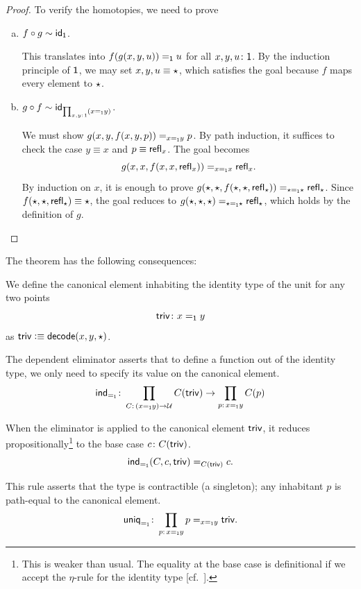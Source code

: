 \begin{proof}
    To verify the homotopies, we need to prove
    \begin{enumerate}[a),font=\upshape]
        \item $f\circ g \sim \mathsf{id}_{\mathsf{1}}$.

        This translates into $f(g(x,y,u)) \mathrel{=_{\mathsf{1}}} u$ for all $x,y,u\colon\fun1$.
        By the induction principle of $\mathsf{1}$, we may set $x,y,u\equiv{\mathsf{\star}}$, which satisfies the goal because $f$ maps every element to ${\mathsf{\star}}$.

        \item $g\circ f \sim \id_{\prod_{x,y\colon\fun1}(x\eq{\fun1}y)}$.

        We must show $g(x,y,f(x,y,p))\mathrel{=_{x\mathrel{=_{\mathsf{1}}}y}}p$.
        By path induction, it suffices to check the case $y\equiv x$ and $p\equiv\mathsf{refl}_x$. The goal becomes
        \[
            g(x,x,f(x,x,\mathsf{refl}_x))\mathrel{=_{x\mathrel{=_{\mathsf{1}}}x}}\mathsf{refl}_x.
        \]
        By induction on $x$, it is enough to prove $g({\mathsf{\star}},{\mathsf{\star}},f({\mathsf{\star}},{\mathsf{\star}},\mathsf{refl}_{\mathsf{\star}}))\mathrel{=_{{\mathsf{\star}}\mathrel{=_{\mathsf{1}}}{\mathsf{\star}}}}\mathsf{refl}_{\mathsf{\star}}$. Since $f({\mathsf{\star}},{\mathsf{\star}},\mathsf{refl}_{\mathsf{\star}})\equiv{\mathsf{\star}}$, the goal reduces to $g({\mathsf{\star}},{\mathsf{\star}},{\mathsf{\star}})\mathrel{=_{{\mathsf{\star}}\mathrel{=_{\mathsf{1}}}{\mathsf{\star}}}}\mathsf{refl}_{\mathsf{\star}}$, which holds by the definition of $g$.\qedhere
    \end{enumerate}
\end{proof}

The theorem has the following consequences:

\begin{description}[font=\normalfont\itshape]
    \item[Introduction rule.]
    We define the canonical element inhabiting the identity type of the unit for any two points
    \[
        \fun{triv} \colon x \eq{\fun1} y
    \]
    as\/ $\mathsf{triv}\mathrel{\vcentcolon}\equiv\mathsf{decode}(x,y,{\mathsf{\star}})$.

    \item[Elimination rule.]
    The dependent eliminator asserts that to define a function out of the identity type, we only need to specify its value on the canonical element.
    \[
        \fun{ind}_{\eq{\fun1}}\colon
        \prod_{C\colon(x\eq{\fun1}y)\to\univ}
        C(\fun{triv})\to\prod_{p\colon x\eq{\fun1}y} C(p)
    \]

    \item[Computation rule.]
    When the eliminator is applied to the canonical element\/ $\mathsf{triv}$, it reduces propositionally\footnote{This is weaker than usual. The equality at the base case is definitional if we accept the\/ $\eta$-rule for the identity type [cf.~].} to the base case\/ $c\colon C(\fun{triv})$.
    \[
        \mathsf{ind}_{\mathrel{=_{\mathsf{1}}}}(C,c,\mathsf{triv})\mathrel{=_{C(\mathsf{triv})}}c.
    \]

    \item[Uniqueness rule.]
    This rule asserts that the type is contractible (a singleton); any inhabitant\/ $p$ is path-equal to the canonical element.
    \[
        \fun{uniq}_{\eq{\fun1}}\colon
        \prod_{p\colon x\eq{\fun1}y}p
            \eq{x\eq{\fun1}y}\fun{triv}.
    \]
\end{description}

